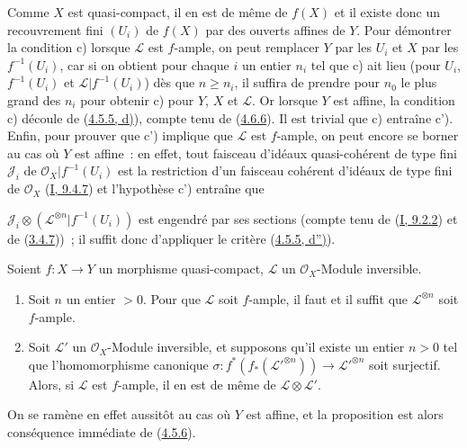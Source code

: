Comme $X$ est quasi-compact, il en est de même de $f(X)$ et il existe donc
un recouvrement fini $(U_i)$ de $f(X)$ par des ouverts affines de $Y$. Pour
démontrer la condition c) lorsque $\mathcal{L}$ est $f$-ample, on peut
remplacer $Y$ par les $U_i$ et $X$ par les $f^{-1}(U_i)$, car si on obtient
pour chaque $i$ un entier $n_i$ tel que c) ait lieu (pour $U_i$,
$f^{-1}(U_i)$ et $\mathcal{L}|f^{-1}(U_i)$) dès que $n\geq n_i$, il
suffira de prendre pour $n_0$ le plus grand des $n_i$ pour obtenir c) pour
$Y$, $X$ et $\mathcal{L}$. Or lorsque $Y$ est affine, la condition c)
découle de (\hyperref[II.4.5.5-fr]{4.5.5, d)}), compte tenu de
(\hyperref[II.4.6.6-fr]{4.6.6}). Il est trivial que c) entraîne c'). Enfin,
pour prouver que c') implique que $\mathcal{L}$ est $f$-ample, on peut
encore se borner au cas où $Y$ est affine~: en effet, tout faisceau
d'idéaux quasi-cohérent de type fini $\mathcal{J}_i$ de
$\mathcal{O}_X|f^{-1}(U_i)$ est la restriction d'un faisceau cohérent
d'idéaux de type fini de $\mathcal{O}_X$
(\hyperref[I.9.4.7-fr]{I, 9.4.7}) et l'hypothèse c') entraîne que


$\mathcal{J}_i\otimes(\mathcal{L}^{\otimes n}|f^{-1}(U_i))$ est engendré
par ses sections (compte tenu de (\hyperref[I.9.2.2-fr]{I, 9.2.2}) et de
(\hyperref[II.3.4.7-fr]{3.4.7}))~; il suffit donc d'appliquer le critère
(\hyperref[II.4.5.5-fr]{4.5.5, d'')}).

\begin{proposition}[4.6.9]
\label{II.4.6.9-fr}
Soient $f:X\to Y$ un morphisme quasi-compact, $\mathcal{L}$ un
$\mathcal{O}_X$-Module inversible.
\begin{enumerate}
  \item[\rm{(i)}] Soit $n$ un entier $>0$. Pour que $\mathcal{L}$ soit
  $f$-ample, il faut et il suffit que $\mathcal{L}^{\otimes n}$ soit
  $f$-ample.
  \item[\rm{(ii)}] Soit $\mathcal{L}'$ un $\mathcal{O}_X$-Module
  inversible, et supposons qu'il existe un entier $n>0$ tel que
  l'homomorphisme canonique
  $\sigma:f^*(f_*(\mathcal{L}'^{\otimes n}))\to
  \mathcal{L}'^{\otimes n}$ soit surjectif. Alors, si $\mathcal{L}$ est
  $f$-ample, il en est de même de $\mathcal{L}\otimes\mathcal{L}'$.
\end{enumerate}
\end{proposition}

On se ramène en effet aussitôt au cas où $Y$ est affine, et la proposition
est alors conséquence immédiate de (\hyperref[II.4.5.6-fr]{4.5.6}).

